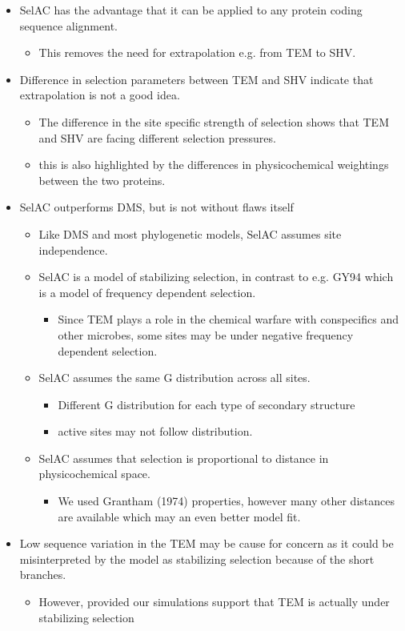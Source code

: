 \documentclass[12pt]{article}
\begin{document}
\begin{itemize}
	\item SelAC has the advantage that it can be applied to any protein coding sequence alignment.
	\begin{itemize}
		\item This removes the need for extrapolation e.g. from TEM to SHV.
	\end{itemize}

	\item Difference in selection parameters between TEM and SHV indicate that extrapolation is not a good idea.
	\begin{itemize}
		\item The difference in the site specific strength of selection shows that TEM and SHV are facing different selection pressures.
		\item this is also highlighted by the differences in physicochemical weightings between the two proteins.
	\end{itemize}

	\item SelAC outperforms DMS, but is not without flaws itself
	\begin{itemize}
		\item Like DMS and most phylogenetic models, SelAC assumes site independence.
		\item SelAC is a model of stabilizing selection, in contrast to e.g. GY94 which is a model of frequency dependent selection.
		\begin{itemize}
			\item Since TEM plays a role in the chemical warfare with conspecifics and other microbes, some sites may be under negative frequency dependent selection.
		\end{itemize}
		\item SelAC assumes the same G distribution across all sites.
		\begin{itemize}
			\item Different G distribution for each type of secondary structure
			\item active sites may not follow distribution.
		\end{itemize}
		\item SelAC assumes that selection is proportional to distance in physicochemical space. 
		\begin{itemize}
			\item We used Grantham (1974) properties, however many other distances are available which may an even better model fit.
		\end{itemize}
	\end{itemize}
	\item Low sequence variation in the TEM may be cause for concern as it could be misinterpreted by the model as stabilizing selection because of the short branches.
	\begin{itemize}
		\item However, provided our simulations support that TEM is actually under stabilizing selection
	\end{itemize}


\end{itemize}
\end{document}
